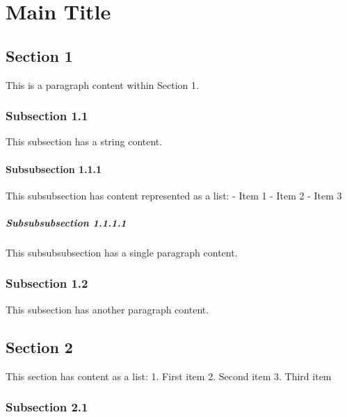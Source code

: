 \hypertarget{main-title}{%
\section{Main Title}\label{main-title}}

\hypertarget{section-1}{%
\subsection{Section 1}\label{section-1}}

This is a paragraph content within Section 1.

\hypertarget{subsection-1.1}{%
\subsubsection{Subsection 1.1}\label{subsection-1.1}}

This subsection has a string content.

\hypertarget{subsubsection-1.1.1}{%
\paragraph{Subsubsection 1.1.1}\label{subsubsection-1.1.1}}

This subsubsection has content represented as a list: - Item 1 - Item 2
- Item 3

\hypertarget{subsubsubsection-1.1.1.1}{%
\subparagraph{Subsubsubsection 1.1.1.1}\label{subsubsubsection-1.1.1.1}}

This subsubsubsection has a single paragraph content.

\hypertarget{subsection-1.2}{%
\subsubsection{Subsection 1.2}\label{subsection-1.2}}

This subsection has another paragraph content.

\hypertarget{section-2}{%
\subsection{Section 2}\label{section-2}}

This section has content as a list: 1. First item 2. Second item 3.
Third item

\hypertarget{subsection-2.1}{%
\subsubsection{Subsection 2.1}\label{subsection-2.1}}

